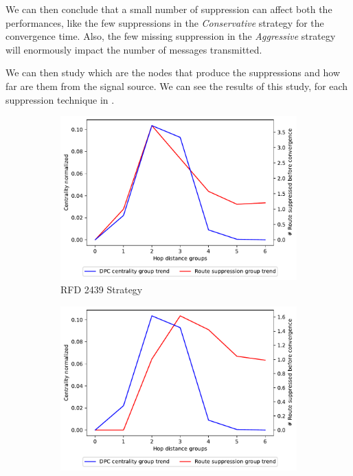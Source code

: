 We can then conclude that a small number of suppression can affect both the 
performances, like the few suppressions in the \textit{Conservative} strategy
for the convergence time.
Also, the few missing suppression in the \textit{Aggressive} strategy will
enormously impact the number of messages transmitted.

We can then study which are the nodes that produce the suppressions and how
far are them from the signal source.
We can see the results of this study, for each suppression technique in .

\begin{figure}[h]
     \centering
     \begin{subfigure}[b]{0.325\textwidth}
         \centering
         \includegraphics[width=\textwidth]{images/RFD/miceVSelephants/mice/cisco_1000_RFD_nodeConvergence_centVSsup_trend.pdf}
         \caption{RFD 2439 Strategy}
         \label{fig:1000_2439RFD_centVSsup}
     \end{subfigure}
     \hfill
     \begin{subfigure}[b]{0.325\textwidth}
         \centering
         \includegraphics[width=\textwidth]{images/RFD/miceVSelephants/mice/cisco_1000_RFD_7196_aggressive_nodeConvergence_centVSsup_trend.pdf}

\end{subfigure}
\end{figure}
